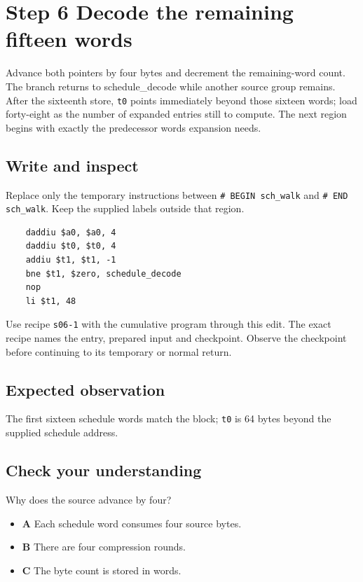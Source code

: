 \section{Step 6 Decode the remaining fifteen words}\label{sha-s06}

Advance both pointers by four bytes and decrement the remaining-word count. The branch returns to schedule\_decode while another source group remains. After the sixteenth store, \texttt{t0} points immediately beyond those sixteen words; load forty-eight as the number of expanded entries still to compute. The next region begins with exactly the predecessor words expansion needs.

\subsection{Write and inspect}
Replace only the temporary instructions between \texttt{\# BEGIN sch\_walk} and \texttt{\# END sch\_walk}. Keep the supplied labels outside that region.

\begin{verbatim}
    daddiu $a0, $a0, 4
    daddiu $t0, $t0, 4
    addiu $t1, $t1, -1
    bne $t1, $zero, schedule_decode
    nop
    li $t1, 48
\end{verbatim}

Use recipe \texttt{s06-1} with the cumulative program through this edit. The exact recipe names the entry, prepared input and checkpoint. Observe the checkpoint before continuing to its temporary or normal return.

\subsection{Expected observation}
The first sixteen schedule words match the block; \texttt{t0} is 64 bytes beyond the supplied schedule address.

\subsection{Check your understanding}
Why does the source advance by four?

\begin{itemize}
  \item \textbf{A} Each schedule word consumes four source bytes.
  \item \textbf{B} There are four compression rounds.
  \item \textbf{C} The byte count is stored in words.
\end{itemize}
